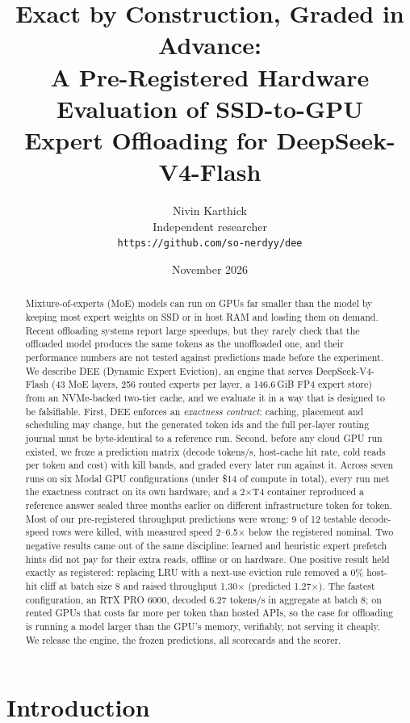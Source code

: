 \documentclass[11pt]{article}
\title{Exact by Construction, Graded in Advance:\\
A Pre-Registered Hardware Evaluation of SSD-to-GPU\\
Expert Offloading for DeepSeek-V4-Flash}
\author{Nivin Karthick \\ Independent researcher \\
\texttt{\small https://github.com/so-nerdyy/dee}}
\date{November 2026}
\newcommand{\dee}{\textsc{DEE}}
\begin{document}
\maketitle

\begin{abstract}
Mixture-of-experts (MoE) models can run on GPUs far smaller than the model by
keeping most expert weights on SSD or in host RAM and loading them on demand.
Recent offloading systems report large speedups, but they rarely check that the
offloaded model produces the same tokens as the unoffloaded one, and their
performance numbers are not tested against predictions made before the
experiment. We describe \dee{} (Dynamic Expert Eviction), an engine that serves
DeepSeek-V4-Flash (43 MoE layers, 256 routed experts per layer, a 146.6\,GiB
FP4 expert store) from an NVMe-backed two-tier cache, and we evaluate it in a
way that is designed to be falsifiable. First, \dee{} enforces an
\emph{exactness contract}: caching, placement and scheduling may change, but the
generated token ids and the full per-layer routing journal must be
byte-identical to a reference run. Second, before any cloud GPU run existed, we
froze a prediction matrix (decode tokens/s, host-cache hit rate, cold reads per
token and cost) with kill bands, and graded every later run against it.
Across seven runs on six Modal GPU configurations (under \$14 of compute in
total), every run met the exactness contract on its own hardware, and a 2$\times$T4
container reproduced a reference answer sealed three months earlier on different
infrastructure token for token. Most of our pre-registered throughput
predictions were wrong: 9 of 12 testable decode-speed rows were killed, with
measured speed 2--6.5$\times$ below the registered nominal. Two negative results
came out of the same discipline: learned and heuristic expert prefetch hints did
not pay for their extra reads, offline or on hardware. One positive result held
exactly as registered: replacing LRU with a next-use eviction rule removed a
0\% host-hit cliff at batch size 8 and raised throughput 1.30$\times$ (predicted
1.27$\times$). The fastest configuration, an RTX PRO 6000, decoded 6.27
tokens/s in aggregate at batch 8; on rented GPUs that costs far more per token
than hosted APIs, so the case for offloading is running a model larger than
the GPU's memory, verifiably, not serving it cheaply. We release the engine, the frozen
predictions, all scorecards and the scorer.
\end{abstract}

\section{Introduction}
\end{document}
